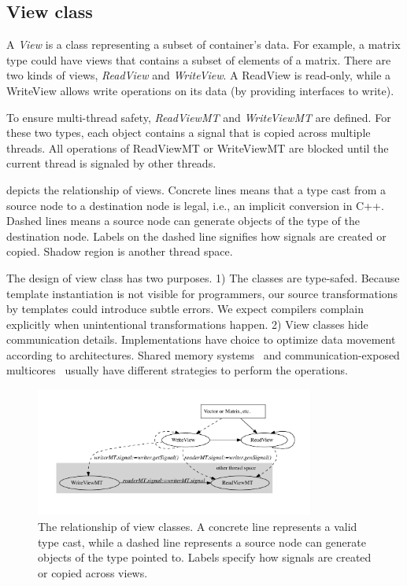 


\subsection{View class}

A \emph{View} is a class representing a subset of container's data. For example,
a matrix type could have views that contains a subset of elements of a matrix.
There are two kinds of views, \emph{ReadView} and \emph{WriteView}.
A ReadView is read-only, while a WriteView allows write operations on its data
(by providing interfaces to write). 

To ensure multi-thread safety, \emph{ReadViewMT} and \emph{WriteViewMT} are
defined. For these two types, each object contains a signal that is copied across multiple
threads. All operations of ReadViewMT or WriteViewMT are blocked until the
current thread is signaled by other threads.

 depicts the relationship of views. Concrete lines means that
a type cast from a source node to a destination node is legal, i.e., an implicit
conversion in C++.  Dashed lines means a source node can generate objects of
the type of the destination node. Labels on the dashed line signifies how
signals are created or copied.
Shadow region is another thread space.


The design of view class has two purposes. 1) The classes are type-safed.
Because template instantiation is not visible for programmers, our
source transformations by templates could introduce subtle errors. We
expect compilers complain explicitly when unintentional
transformations happen. 2) View classes hide communication details. 
Implementations have choice to optimize data movement according to
architectures. Shared memory systems~\cite{larrabee} and communication-exposed multicores~\cite{cellbe, imagine} usually have different strategies to perform
the operations.

\begin{figure}
\includegraphics[width=3.6in]{../relationship_views}
\caption{The relationship of view classes. A concrete line represents a valid
   type cast, while a dashed line represents a source node can generate objects
of the type pointed to. Labels specify how signals are created or copied
across views.}
\label{fig:view}
\end{figure}



